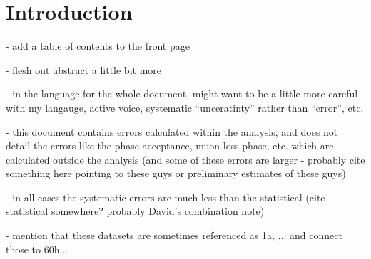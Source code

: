 
\graphicspath{}

\section{Introduction}

- add a table of contents to the front page

- flesh out abstract a little bit more

- in the language for the whole document, might want to be a little more careful with my langauge, active voice, systematic ``unceratinty'' rather than ``error'', etc.

- this document contains errors calculated within the analysis, and does not detail the errors like the phase acceptance, muon loss phase, etc. which are calculated outside the analysis (and some of these errors are larger - probably cite something here pointing to these guys or preliminary estimates of these guys)

- in all cases the systematic errors are much less than the statistical (cite statistical somewhere? probably David's combination note)


- mention that these datasets are sometimes referenced as 1a, ... and connect those to 60h... 
